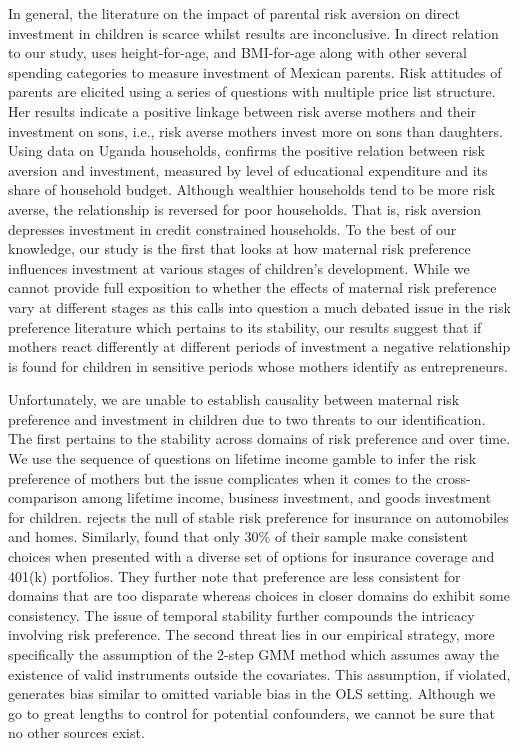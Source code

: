 \documentclass[emulatestandardclasses, 10pt, abstract = true]{scrartcl}
\begin{document}
In general, the literature on the impact of parental risk aversion on direct investment in children is scarce whilst results are inconclusive. In direct relation to our study, \citet{sovero2018risk} uses height-for-age, and BMI-for-age along with other several spending categories to measure investment of Mexican parents. Risk attitudes of parents are elicited using a series of questions with multiple price list structure. Her results indicate a positive linkage between risk averse mothers and their investment on sons, i.e., risk averse mothers invest more on sons than daughters. Using data on Uganda households, \citet{tabetando2019parental} confirms the positive relation between risk aversion and investment, measured by level of educational expenditure and its share of household budget. Although wealthier households tend to be more risk averse, the relationship is reversed for poor households. That is, risk aversion depresses investment in credit constrained households. To the best of our knowledge, our study is the first that looks at how maternal risk preference influences investment at various stages of children's development. While we cannot provide full exposition to whether the effects of maternal risk preference vary at different stages as this calls into question a much debated issue in the risk preference literature which pertains to its stability, our results suggest that if mothers react differently at different periods of investment a negative relationship is found for children in sensitive periods whose mothers identify as entrepreneurs. 

Unfortunately, we are unable to establish causality between maternal risk preference and investment in children due to two threats to our identification. The first pertains to the stability across domains of risk preference and over time. We use the sequence of questions on lifetime income gamble to infer the risk preference of mothers but the issue complicates when it comes to the cross-comparison among lifetime income, business investment, and goods investment for children.  \citet{barseghyan2011risk} rejects the null of stable risk preference for insurance on automobiles and homes. Similarly, \citet{einav2012general} found that only 30\% of their sample make consistent choices when presented with a diverse set of options for insurance coverage and 401(k) portfolios. They further note that preference are less consistent for domains that are too disparate whereas choices in closer domains do exhibit some consistency. The issue of temporal stability further compounds the intricacy involving risk preference. The second threat lies in our empirical strategy, more specifically the assumption of the 2-step GMM method which assumes away the existence of valid instruments outside the covariates. This assumption, if violated, generates bias similar to omitted variable bias in the OLS setting. Although we go to great lengths to control for potential confounders, we cannot be sure that no other sources exist.
\end{document}
